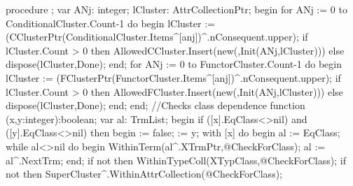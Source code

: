 procedure ;
var
   ANj: integer;
   lCluster: AttrCollectionPtr;
begin
   for ANj := 0 to ConditionalCluster.Count-1 do
   begin
      lCluster := (CClusterPtr(ConditionalCluster.Items^[anj])^.nConsequent.upper);
      if lCluster.Count > 0 then
         AllowedCCluster.Insert(new(,Init(ANj,lCluster)))
      else dispose(lCluster,Done);
   end;
   for ANj := 0 to FunctorCluster.Count-1 do
   begin
      lCluster := (FClusterPtr(FunctorCluster.Items^[anj])^.nConsequent.upper);
      if lCluster.Count > 0 then
         AllowedFCluster.Insert(new(,Init(ANj,lCluster)))
      else dispose(lCluster,Done);
   end;
end;
\eatline
{}\nwendcode{}\nwdocspar
\nwenddocs{}\endmoddef\nwstartdeflinemarkup\nwenddeflinemarkup
//Checks class dependence
function (x,y:integer):boolean;
var
   al: TrmList;
begin
   if ([x].EqClass<>nil) and ([y].EqClass<>nil) then
   begin
       := false;
       := y;
      with [x] do
      begin
         al := EqClass;
         while al<>nil do
         begin
            WithinTerm(al^.XTrmPtr,@CheckForClass);
            al := al^.NextTrm;
         end;
         if not  then WithinTypeColl(XTypClass,@CheckForClass);
         if not  then SuperCluster^.WithinAttrCollection(@CheckForClass);
